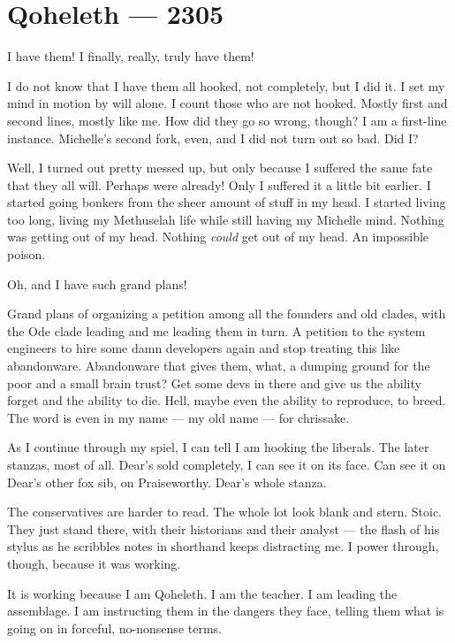 \hypertarget{qoheleth-2305}{%
\chapter*{Qoheleth — 2305}\label{qoheleth-2305}}

I have them! I finally, really, truly have them!

I do not know that I have them all hooked, not completely, but I did it. I set my mind in motion by will alone. I count those who are not hooked. Mostly first and second lines, mostly like me. How did they go so wrong, though? I am a first-line instance. Michelle's second fork, even, and I did not turn out so bad. Did I?

Well, I turned out pretty messed up, but only because I suffered the same fate that they all will. Perhaps were already! Only I suffered it a little bit earlier. I started going bonkers from the sheer amount of stuff in my head. I started living too long, living my Methuselah life while still having my Michelle mind. Nothing was getting out of my head. Nothing \emph{could} get out of my head. An impossible poison.

Oh, and I have such grand plans!

Grand plans of organizing a petition among all the founders and old clades, with the Ode clade leading and me leading them in turn. A petition to the system engineers to hire some damn developers again and stop treating this like abandonware. Abandonware that gives them, what, a dumping ground for the poor and a small brain trust? Get some devs in there and give us the ability forget and the ability to die. Hell, maybe even the ability to reproduce, to breed. The word is even in my name — my old name — for chrissake.

As I continue through my spiel, I can tell I am hooking the liberals. The later stanzas, most of all. Dear's sold completely, I can see it on its face. Can see it on Dear's other fox sib, on Praiseworthy. Dear's whole stanza.

The conservatives are harder to read. The whole lot look blank and stern. Stoic. They just stand there, with their historians and their analyst — the flash of his stylus as he scribbles notes in shorthand keeps distracting me. I power through, though, because it was working.

It is working because I am Qoheleth. I am the teacher. I am leading the assemblage. I am instructing them in the dangers they face, telling them what is going on in forceful, no-nonsense terms.

